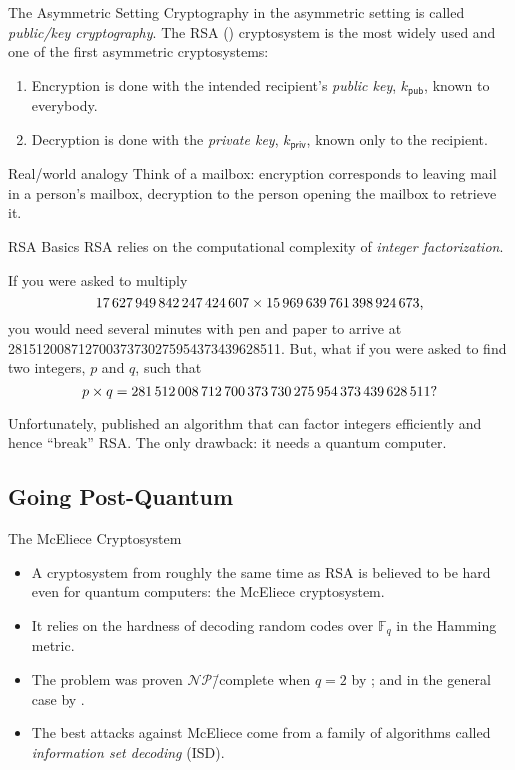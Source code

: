 \documentclass[usepdftitle=false]{beamer}
\newcommand*{\pub}{\ensuremath{\mathsf{pub}}}
\newcommand*{\priv}{\ensuremath{\mathsf{priv}}}
\newcommand*{\FF}{\ensuremath{\mathbb{F}}}
\newcommand*{\NP}{\ensuremath{\mathcal{NP}}}
\begin{document}
\begin{frame}{The Asymmetric Setting}
  Cryptography in the asymmetric setting is called \emph{public\-/key
    cryptography}.  The RSA (\citeauthor{RSA78}) cryptosystem is the
  most widely used and one of the first asymmetric cryptosystems:
  \begin{enumerate}
  \item Encryption is done with the intended recipient's \emph{public
      key}, \(k_{\pub}\), known to everybody.
  \item Decryption is done with the \emph{private key}, \(k_{\priv}\),
    known only to the recipient.
  \end{enumerate}
  \begin{block}{Real\-/world analogy}
    Think of a mailbox: encryption corresponds to leaving mail in a
    person's mailbox, decryption to the person opening the mailbox to
    retrieve it.
  \end{block}
\end{frame}

\begin{frame}{RSA Basics}
  RSA relies on the computational complexity of \emph{integer
    factorization}.
  \begin{example}
    If you were asked to multiply
    \[
      \num{17627949842247424607} \times \num{15969639761398924673}\text,
    \]
    you would need several minutes with pen and paper to arrive at
    \num{281512008712700373730275954373439628511}.  But, what if you
    were asked to find two integers, \(p\) and \(q\), such that
    \[
      p \times q = \num{281512008712700373730275954373439628511}\text?
    \]
  \end{example}
  Unfortunately, \citeauthor{Sho97} published an algorithm that can
  factor integers efficiently and hence \enquote{break} RSA\@.  The
  only drawback: it needs a \alert{quantum computer}.
\end{frame}

\subsection{Going Post-Quantum}

\begin{frame}{The McEliece Cryptosystem}
  \begin{itemize}
  \item A cryptosystem from roughly the same time as RSA is believed
    to be hard even for quantum computers: the McEliece cryptosystem.
  \item It relies on the hardness of decoding random codes over
    \(\FF_q\) in the Hamming metric.
  \item The problem was proven \NP\=/complete when \(q = 2\) by
    \citeauthor{BEvT78}; and in the general case by
    \citeauthor{Bar94}.
  \item The best attacks against McEliece come from a family of
    algorithms called \emph{information set decoding} (ISD).
  \end{itemize}
\end{frame}
\end{document}
